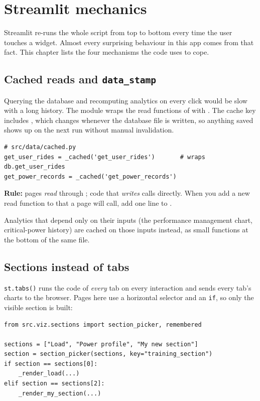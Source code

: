 \chapter{Streamlit mechanics}

Streamlit re-runs the whole script from top to bottom every time the user touches a widget. Almost every surprising
behaviour in this app comes from that fact. This chapter lists the four mechanisms the code uses to cope.

\section{Cached reads and \texttt{data\_stamp}}

Querying the database and recomputing analytics on every click would be slow with a long history. The module
 wraps the read functions of  with . The cache key
includes , which changes whenever the database file is written, so anything saved shows up on the
next run without manual invalidation.

\begin{lstlisting}
# src/data/cached.py
get_user_rides = _cached('get_user_rides')       # wraps db.get_user_rides
get_power_records = _cached('get_power_records')
\end{lstlisting}

\textbf{Rule:} pages \emph{read} through ; code that \emph{writes} calls  directly. When you add
a new read function to  that a page will call, add one line to .

Analytics that depend only on their inputs (the performance management chart, critical-power history) are cached on
those inputs instead, as small functions at the bottom of the same file.

\section{Sections instead of tabs}

\texttt{st.tabs()} runs the code of \emph{every} tab on every interaction and sends every tab's charts to the
browser. Pages here use a horizontal selector and an \texttt{if}, so only the visible section is built:

\begin{lstlisting}
from src.viz.sections import section_picker, remembered

sections = ["Load", "Power profile", "My new section"]
section = section_picker(sections, key="training_section")
if section == sections[0]:
    _render_load(...)
elif section == sections[2]:
    _render_my_section(...)
\end{lstlisting}

